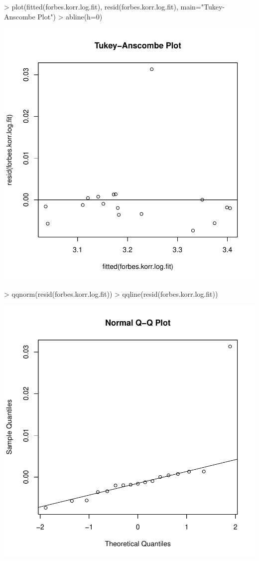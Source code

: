 \begin{Schunk}
\begin{Sinput}
> plot(fitted(forbes.korr.log.fit), resid(forbes.korr.log.fit), main="Tukey-Anscombe Plot")
> abline(h=0)
\end{Sinput}
\end{Schunk}
\includegraphics{sw12_1-013}
\begin{Schunk}
\begin{Sinput}
> qqnorm(resid(forbes.korr.log.fit))
> qqline(resid(forbes.korr.log.fit))
\end{Sinput}
\end{Schunk}
\includegraphics{sw12_1-014}
